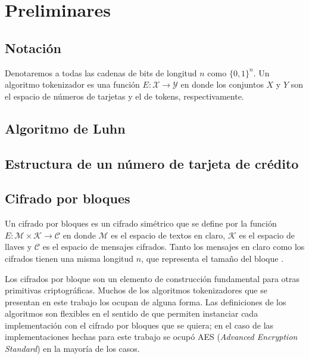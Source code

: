 %
%

\section{Preliminares}



\subsection{Notación}

Denotaremos a todas las cadenas de bits de longitud $ n $ como $ \{ 0, 1 \}^n $.
Un algoritmo tokenizador es una función $ E: \mathcal{X} \rightarrow
\mathcal{Y} $ en donde los conjuntos $ X $ y $ Y $ son el espacio de números de
tarjetas y el de tokens, respectivamente.

\subsection{Algoritmo de Luhn}

\subsection{Estructura de un número de tarjeta de crédito}

\subsection{Cifrado por bloques}

Un cifrado por bloques es un cifrado simétrico que se define por la función $ E:
\mathcal{M} \times \mathcal{K} \rightarrow \mathcal{C} $ en donde $ \mathcal{M} $
es el espacio de textos en claro, $ \mathcal{K} $ es el espacio de llaves y $
\mathcal{C} $ es el espacio de mensajes cifrados. Tanto los mensajes en claro
como los cifrados tienen una misma longitud $ n $, que representa el tamaño del
bloque \cite{menezes}.

Los cifrados por bloque son un elemento de construcción fundamental para otras
primitivas criptográficas. Muchos de los algoritmos tokenizadores que se
presentan en este trabajo los ocupan de alguna forma. Las definiciones de los
algoritmos son flexibles en el sentido de que permiten instanciar cada
implementación con el cifrado por bloques que se quiera; en el caso de las
implementaciones hechas para este trabajo se ocupó AES (\textit{Advanced
Encryption Standard}) en la mayoría de los casos.


